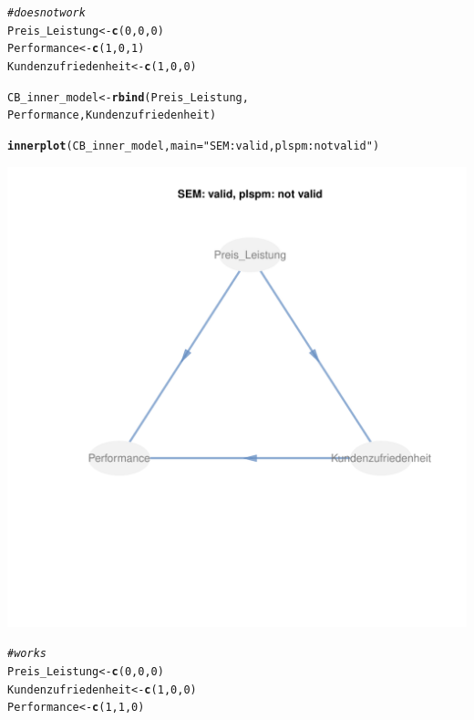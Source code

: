 \documentclass{article}\usepackage[]{graphicx}\usepackage[]{color}
\makeatletter
\def\maxwidth{ %
  \ifdim\Gin@nat@width>\linewidth
    \linewidth
  \else
    \Gin@nat@width
  \fi
}
\newcommand{\hlnum}[1]{\textcolor[rgb]{0.686,0.059,0.569}{#1}}%
\newcommand{\hlstr}[1]{\textcolor[rgb]{0.192,0.494,0.8}{#1}}%
\newcommand{\hlcom}[1]{\textcolor[rgb]{0.678,0.584,0.686}{\textit{#1}}}%
\newcommand{\hlstd}[1]{\textcolor[rgb]{0.345,0.345,0.345}{#1}}%
\newcommand{\hlkwb}[1]{\textcolor[rgb]{0.69,0.353,0.396}{#1}}%
\newcommand{\hlkwc}[1]{\textcolor[rgb]{0.333,0.667,0.333}{#1}}%
\newcommand{\hlkwd}[1]{\textcolor[rgb]{0.737,0.353,0.396}{\textbf{#1}}}%
\newenvironment{kframe}{%
 \def\at@end@of@kframe{}%
 \ifinner\ifhmode%
  \def\at@end@of@kframe{\end{minipage}}%
  \begin{minipage}{\columnwidth}%
 \fi\fi%
 \def\FrameCommand##1{\hskip\@totalleftmargin \hskip-\fboxsep
 \colorbox{shadecolor}{##1}\hskip-\fboxsep
     \hskip-\linewidth \hskip-\@totalleftmargin \hskip\columnwidth}%
 \MakeFramed {\advance\hsize-\width
   \@totalleftmargin\z@ \linewidth\hsize
   \@setminipage}}%
 {\par\unskip\endMakeFramed%
 \at@end@of@kframe}
\newenvironment{knitrout}{}{} %
\makeatother
\begin{document}
\begin{knitrout}
\color{fgcolor}\begin{kframe}
\begin{alltt}
\hlcom{#does not work}
\hlstd{Preis_Leistung} \hlkwb{<-} \hlkwd{c}\hlstd{(}\hlnum{0}\hlstd{,}\hlnum{0}\hlstd{,}\hlnum{0}\hlstd{)}
\hlstd{Performance} \hlkwb{<-} \hlkwd{c}\hlstd{(}\hlnum{1}\hlstd{,}\hlnum{0}\hlstd{,}\hlnum{1}\hlstd{)}
\hlstd{Kundenzufriedenheit} \hlkwb{<-} \hlkwd{c}\hlstd{(}\hlnum{1}\hlstd{,}\hlnum{0}\hlstd{,}\hlnum{0}\hlstd{)}

\hlstd{CB_inner_model} \hlkwb{<-} \hlkwd{rbind}\hlstd{(Preis_Leistung,}
                        \hlstd{Performance, Kundenzufriedenheit)}

\hlkwd{innerplot}\hlstd{(CB_inner_model,} \hlkwc{main}\hlstd{=}\hlstr{"SEM: valid, plspm: not valid"}\hlstd{)}
\end{alltt}
\end{kframe}
\includegraphics[width=\maxwidth]{figure/mis1} 
\begin{kframe}\begin{alltt}
\hlcom{#works}
\hlstd{Preis_Leistung} \hlkwb{<-} \hlkwd{c}\hlstd{(}\hlnum{0}\hlstd{,}\hlnum{0}\hlstd{,}\hlnum{0}\hlstd{)}
\hlstd{Kundenzufriedenheit} \hlkwb{<-} \hlkwd{c}\hlstd{(}\hlnum{1}\hlstd{,}\hlnum{0}\hlstd{,}\hlnum{0}\hlstd{)}
\hlstd{Performance} \hlkwb{<-} \hlkwd{c}\hlstd{(}\hlnum{1}\hlstd{,}\hlnum{1}\hlstd{,}\hlnum{0}\hlstd{)}


\end{alltt}
\end{kframe}
\end{knitrout}
\end{document}
